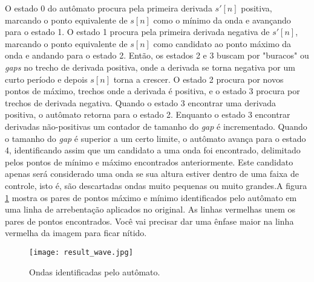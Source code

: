 \noindent{}O estado 0 do autômato procura pela primeira derivada $s'[n]$ positiva, marcando o ponto equivalente de $s[n]$ como o mínimo da onda e avançando para o estado 1. O estado 1 procura pela primeira derivada negativa de $s'[n]$, marcando o ponto equivalente de $s[n]$ como candidato ao ponto máximo da onda e andando para o estado 2. Então, os estados 2 e 3 buscam por "buracos" ou \textit{gaps} no trecho de derivada positiva, onde a derivada se torna negativa por um curto período e depois $s[n]$ torna a crescer. O estado 2 procura por novos pontos de máximo, trechos onde a derivada é positiva, e o estado 3 procura por trechos de derivada negativa. Quando o estado 3 encontrar uma derivada positiva, o autômato retorna para o estado 2. Enquanto o estado 3 encontrar derivadas não-positivas um contador de tamanho do \textit{gap} é incrementado. Quando o tamanho do \textit{gap} é superior a um certo limite, o autômato avança para o estado 4, identificando assim que um candidato a uma onda foi encontrado, delimitado pelos pontos de mínimo e máximo encontrados anteriormente. Este candidato apenas será considerado uma onda se sua altura estiver dentro de uma faixa de controle, isto é, são descartadas ondas muito pequenas ou muito grandes.A figura \ref{FigWave} mostra os pares de pontos máximo e mínimo identificados pelo autômato em uma linha de arrebentação aplicados no \timestack original. As linhas vermelhas unem os pares de pontos encontrados. Você vai precisar dar uma ênfase maior na linha vermelha da imagem para ficar nítido.
\begin{figure}[h]
\begin{center}
  \texttt{[image: result\_wave.jpg]}
  \caption[\small{Ondas identificadas pelo autômato.}]{\label{FigWave} \small{Ondas identificadas pelo autômato.}}
\end{center}
\end{figure}

